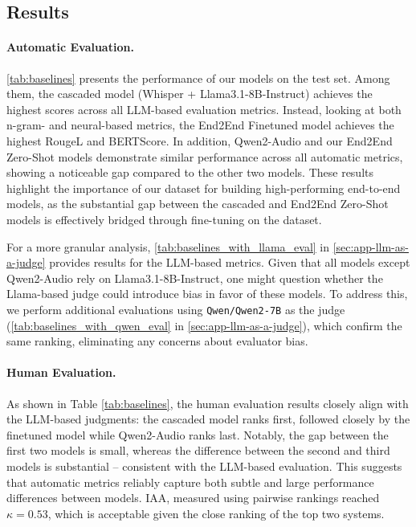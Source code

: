 \subsection{Results}
\paragraph{Automatic Evaluation.}

\cref{tab:baselines} presents the performance of our models on the \DATASETNAME{} test set. Among them, the cascaded model (Whisper + Llama3.1-8B-Instruct) achieves the highest scores across all LLM-based evaluation metrics. Instead, looking at both n-gram- and neural-based metrics, the End2End Finetuned model achieves the highest RougeL and BERTScore. In addition, Qwen2-Audio and our End2End Zero-Shot models
demonstrate similar performance across all automatic metrics, showing a noticeable gap compared to the 
other two models. These results
highlight the importance of 
our dataset for building high-performing end-to-end models, as the substantial gap between the cascaded and End2End Zero-Shot models is effectively bridged through fine-tuning on the \DATASETNAME{} dataset.

For a more granular analysis, \cref{tab:baselines_with_llama_eval} in \cref{sec:app-llm-as-a-judge} provides 
results for the LLM-based 
metrics.
Given that all models except Qwen2-Audio rely on Llama3.1-8B-Instruct, one might 
question whether the Llama-based judge could introduce bias in favor of these models. To address this, we perform additional evaluations using \texttt{Qwen/Qwen2-7B} \citep{yang2024qwen2technicalreport} as the judge (\cref{tab:baselines_with_qwen_eval} in \cref{sec:app-llm-as-a-judge}), which confirm the same ranking,  eliminating any concerns about evaluator bias.

\paragraph{Human Evaluation.}
As shown in Table \ref{tab:baselines}, the human evaluation results closely align with the LLM-based  judgments: the cascaded model 
ranks first, followed closely by the finetuned model while Qwen2-Audio ranks last. Notably, the 
gap between the first two models is small, whereas the difference between the second and third models is substantial
-- consistent with the LLM-based evaluation. This suggests that automatic metrics reliably capture both subtle and large performance differences between models. IAA, measured using pairwise rankings \citep{bojar-etal-2016-findings} reached $\kappa = 0.53$, which is acceptable
given the close ranking of the top two systems.
